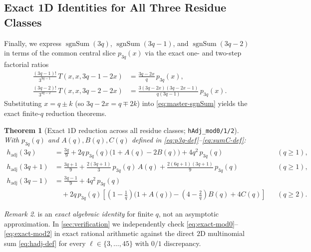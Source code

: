 \documentclass[11pt,a4paper]{article}
\numberwithin{equation}{section}
\theoremstyle{plain}
\newtheorem{theorem}{Theorem}[section]
\theoremstyle{definition}
\theoremstyle{remark}
\newtheorem{remark}[theorem]{Remark}
\newcommand{\hadj}{h_{\mathrm{adj}}}
\newcommand{\code}[1]{\texttt{\small #1}}
\begin{document}
\subsection{Exact 1D Identities for All Three Residue Classes}

Finally, we express $\operatorname{sgnSum}(3q)$, $\operatorname{sgnSum}(3q-1)$, and $\operatorname{sgnSum}(3q-2)$ in terms of the common central slice $p_{3q}(x)$ via the exact one- and two-step factorial ratios
\begin{align*}
  \frac{(3q-1)!}{3^{3q-1}}\,T(x,x,3q-1-2x)
  &= \frac{3q-2x}{q}\,p_{3q}(x),\\
  \frac{(3q-2)!}{3^{3q-2}}\,T(x,x,3q-2-2x)
  &= \frac{3(3q-2x)(3q-2x-1)}{q(3q-1)}\,p_{3q}(x).
\end{align*}
Substituting $x=q\pm k$ (so $3q-2x=q\mp 2k$) into \eqref{eq:master-sgnSum} yields the exact finite-$q$ reduction theorems.

\begin{theorem}[Exact $1\mathrm{D}$ reduction across all residue classes; \code{hAdj\_mod0/1/2}]
\label{thm:exact-1d}
With $p_{3q}(q)$ and $A(q),B(q),C(q)$ defined in \eqref{eq:p3q-def}--\eqref{eq:sumC-def}:
\begin{align}
  \hadj(3q)
  &= \frac{3q}{9} + 2q\,p_{3q}(q)\bigl(1 + A(q) - 2B(q)\bigr) + 4q^2\,p_{3q}(q)
  &&(q\ge 1), \label{eq:exact-mod0}\\
  \hadj(3q+1)
  &= \frac{3q+1}{9} + \frac{2(3q+1)}{3}\,p_{3q}(q)\,A(q) + \frac{2(6q+1)(3q+1)}{9}\,p_{3q}(q)
  &&(q\ge 1), \label{eq:exact-mod1}\\
  \hadj(3q-1)
  &= \frac{3q-1}{9} + 4q^2\,p_{3q}(q)\nonumber\\
  &\quad + 2q\,p_{3q}(q)\!\left[\left(1-\frac{1}{q}\right)\bigl(1+A(q)\bigr) - \left(4-\frac{2}{q}\right)B(q) + 4C(q)\right]
  &&(q\ge 2). \label{eq:exact-mod2}
\end{align}
\end{theorem}

\begin{remark}
 is an \emph{exact algebraic identity} for finite $q$, not an asymptotic approximation. In \cref{sec:verification} we independently check \eqref{eq:exact-mod0}--\eqref{eq:exact-mod2} in exact rational arithmetic against the direct $2\mathrm{D}$ multinomial sum \eqref{eq:hadj-def} for every $\ell\in\{3,\dots,45\}$ with $0/1$ discrepancy.
\end{remark}
\end{document}
